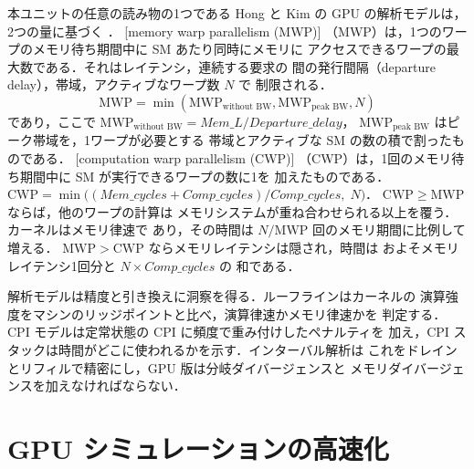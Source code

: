 \documentclass[../main.tex]{subfiles}
\begin{document}
\begin{note}
  \label{note:l08-mwp-cwp}
  本ユニットの任意の読み物の1つである Hong と Kim の GPU の解析モデルは，
  2つの量に基づく \cite{hong2009analytical}．
  [memory warp parallelism (MWP)]
  （MWP）は，1つのワープのメモリ待ち期間中に SM あたり同時にメモリに
  アクセスできるワープの最大数である．それはレイテンシ，連続する要求の
  間の発行間隔（departure delay），帯域，アクティブなワープ数 $N$ で
  制限される．
  \[
    \mathrm{MWP} = \min(\mathrm{MWP}_{\text{without BW}},
    \mathrm{MWP}_{\text{peak BW}}, N)
  \]
  であり，ここで
  $\mathrm{MWP}_{\text{without BW}} =
  \textit{Mem\_L}/\textit{Departure\_delay}$，
  $\mathrm{MWP}_{\text{peak BW}}$ はピーク帯域を，1ワープが必要とする
  帯域とアクティブな SM の数の積で割ったものである．
  [computation warp parallelism (CWP)]
  （CWP）は，1回のメモリ待ち期間中に SM が実行できるワープの数に1を
  加えたものである．
  $\mathrm{CWP} = \min\bigl((\textit{Mem\_cycles} +
  \textit{Comp\_cycles})/\textit{Comp\_cycles},\; N\bigr)$．
  $\mathrm{CWP} \geq \mathrm{MWP}$ ならば，他のワープの計算は
  メモリシステムが重ね合わせられる以上を覆う．カーネルはメモリ律速で
  あり，その時間は $N/\mathrm{MWP}$ 回のメモリ期間に比例して増える．
  $\mathrm{MWP} > \mathrm{CWP}$ ならメモリレイテンシは隠され，時間は
  およそメモリレイテンシ1回分と $N \times \textit{Comp\_cycles}$ の
  和である．
\end{note}

\begin{keypoint}
  解析モデルは精度と引き換えに洞察を得る．ルーフラインはカーネルの
  演算強度をマシンのリッジポイントと比べ，演算律速かメモリ律速かを
  判定する．CPI モデルは定常状態の CPI に頻度で重み付けしたペナルティを
  加え，CPI スタックは時間がどこに使われるかを示す．インターバル解析は
  これをドレインとリフィルで精密にし，GPU 版は分岐ダイバージェンスと
  メモリダイバージェンスを加えなければならない．
\end{keypoint}

\section{GPU シミュレーションの高速化}
\label{sec:l08-accelerating}
\end{document}
